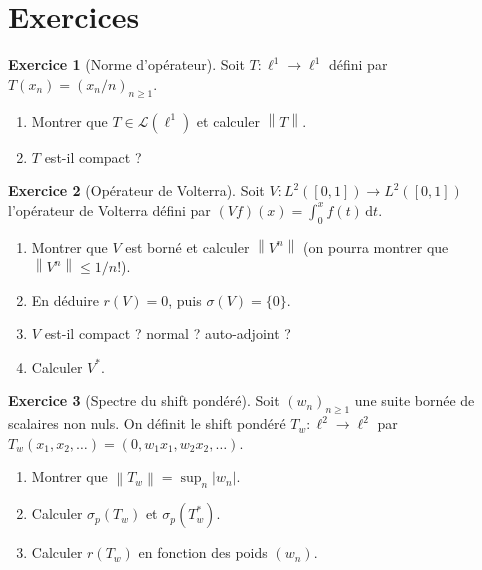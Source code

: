 \documentclass[a4paper,12pt]{book}
\newcommand{\dd}{\mathrm{d}}
\newcommand{\norm}[1]{\left\| #1 \right\|}
\newcommand{\abs}[1]{\left| #1 \right|}
\theoremstyle{definition}
\newtheorem{exercice}{Exercice}[chapter]
\theoremstyle{plain}
\theoremstyle{remark}
\begin{document}
\section{Exercices}
\label{sec:exos-chap3}

\begin{exercice}[Norme d'opérateur]\label{exo:norme-operateur}
Soit $T : \ell^1 \to \ell^1$ défini par $T(x_n) = (x_n / n)_{n \geq 1}$.
\begin{enumerate}[label=(\alph*)]
    \item Montrer que $T \in \mathcal{L}(\ell^1)$ et calculer $\norm{T}$.
    \item $T$ est-il compact ?
\end{enumerate}
\end{exercice}

\begin{exercice}[Opérateur de Volterra]\label{exo:volterra}
Soit $V : L^2([0,1]) \to L^2([0,1])$ l'opérateur de Volterra défini par
$(Vf)(x) = \int_0^x f(t)\, \dd t$.
\begin{enumerate}[label=(\alph*)]
    \item Montrer que $V$ est borné et calculer $\norm{V^n}$ (on pourra montrer que
          $\norm{V^n} \leq 1/n!$).
    \item En déduire $r(V) = 0$, puis $\sigma(V) = \{0\}$.
    \item $V$ est-il compact ? normal ? auto-adjoint ?
    \item Calculer $V^*$.
\end{enumerate}
\end{exercice}

\begin{exercice}[Spectre du shift pondéré]\label{exo:shift-pondere}
Soit $(w_n)_{n \geq 1}$ une suite bornée de scalaires non nuls. On définit le shift
pondéré $T_w : \ell^2 \to \ell^2$ par $T_w(x_1, x_2, \ldots) = (0, w_1 x_1, w_2 x_2, \ldots)$.
\begin{enumerate}[label=(\alph*)]
    \item Montrer que $\norm{T_w} = \sup_n \abs{w_n}$.
    \item Calculer $\sigma_p(T_w)$ et $\sigma_p(T_w^*)$.
    \item Calculer $r(T_w)$ en fonction des poids $(w_n)$.
\end{enumerate}
\end{exercice}
\end{document}

